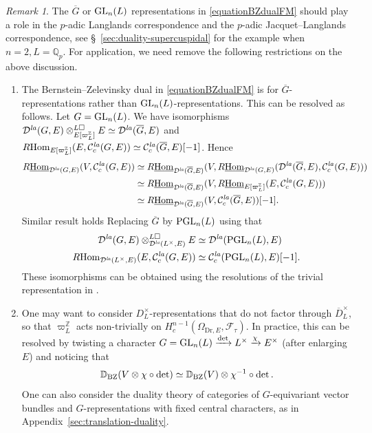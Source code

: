 \documentclass[a4paper,10pt]{amsart}
\theoremstyle{remark}
\newtheorem{remark}[theorem]{Remark}
\theoremstyle{definition}
\theoremstyle{plain}
\numberwithin{equation}{section}
\newcommand{\bbD}{{\mathbb D}}
\newcommand{\bbQ}{{\mathbb Q}}
\newcommand{\bbZ}{{\mathbb Z}}
\newcommand{\calC}{{\mathcal C}}
\newcommand{\calD}{{\mathcal D}}
\newcommand{\calF}{{\mathcal F}}
\newcommand{\ovD}{{\overline D}}
\newcommand{\ovG}{{\overline G}}
\newcommand{\GL}{{\rm GL}}
\newcommand{\Hom}{{\rm Hom}}
\newcommand{\uHom}{\underline{\Hom}}
\newcommand{\la}{{\it la}}
\newcommand{\PGL}{{\rm PGL}}
\begin{document}
\begin{remark}\label{remarkothercentralcharacter}
	The $\ovG$ or $\GL_n(L)$ representations in \eqref{equationBZdualFM} should play a role in the $p$-adic Langlands correspondence and the $p$-adic Jacquet--Langlands correspondence, see \S~\ref{sec:duality-supercuspidal} for the example when $n=2,L=\bbQ_p$.  For application, we need remove the following restrictions on the above discussion. 
	\begin{enumerate}
		\item The Bernstein--Zelevinsky dual in \eqref{equationBZdualFM} is for $\ovG$-representations rather than $\GL_n(L)$-representations. This can be resolved as follows. Let $G=\GL_n(L)$. We have isomorphisms $\calD^{\la}(G,E)\otimes_{E[\varpi_L^{\bbZ}]}^{L\square}E\simeq \calD^{\la}(\ovG,E)$ and $R\Hom_{E[\varpi_L^{\bbZ}]}(E,\calC_c^{\la}(G,E))\simeq \calC_c^{\la}(\ovG,E)[-1]$. Hence
		\begin{equation}
			\begin{aligned}
				R\uHom_{\calD^{\la}(G,E)}(V,\calC_c^{\la}(G,E))&\simeq R\uHom_{\calD^{\la}(\ovG,E)}(V,R\uHom_{\calD^{\la}(G,E)}(\calD^{\la}(\ovG,E),\calC_c^{\la}(G,E)))\\
				&\simeq R\uHom_{\calD^{\la}(\ovG,E)}(V,R\uHom_{E[\varpi_L^{\bbZ}]}(E,\calC_c^{\la}(G,E)))\\
				&\simeq R\uHom_{\calD^{\la}(\ovG,E)}(V,\calC_c^{\la}(\ovG,E))[-1].
			\end{aligned}
		\end{equation}
		Similar result holds Replacing $\ovG$ by $\PGL_n(L)$ using that 
		\begin{align*}
			\calD^{\la}(G,E)\otimes_{\calD^{\la}(L^{\times},E)}^{L\square}E&\simeq \calD^{\la}(\PGL_n(L),E)\\
			R\Hom_{\calD^{\la}(L^{\times},E)}(E,\calC_c^{\la}(G,E))&\simeq \calC_c^{\la}(\PGL_n(L),E)[-1].	
		\end{align*}
		These isomorphisms can be obtained using the resolutions of the trivial representation in \cite[Thm.~5.8]{rodrigues2022solid}.
		\item One may want to consider $D_L^{\times}$-representations that do not factor through $\ovD_L^{\times}$, so that $\varpi_L^{\bbZ}$ acts non-trivially on $H^{n-1}_c(\Omega_{\mathrm{Dr},E},\calF_{\tau})$. In practice, this can be resolved by twisting a character $G=\GL_n(L)\xrightarrow{\det}L^{\times}\xrightarrow{\chi}E^{\times}$ (after enlarging $E$) and noticing that \[\bbD_{\rm BZ}(V\otimes \chi\circ \det)\simeq \bbD_{\rm BZ}(V)\otimes \chi^{-1}\circ \det.\]
		One can also consider the duality theory of categories of $G$-equivariant vector bundles and $G$-representations with fixed central characters, as in Appendix~\ref{sec:translation-duality}. 
	\end{enumerate}
\end{remark}
\end{document}
